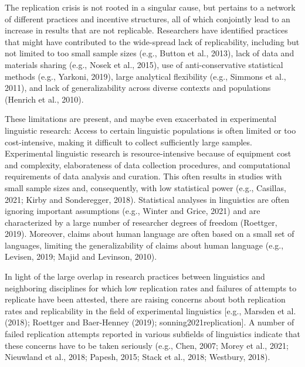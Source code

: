 \documentclass[]{elsarticle} %
\begin{document}
The replication crisis is not rooted in a singular cause, but pertains to a network of different practices and incentive structures, all of which conjointly lead to an increase in results that are not replicable. Researchers have identified practices that might have contributed to the wide-spread lack of replicability, including but not limited to too small sample sizes (e.g., Button et al., 2013), lack of data and materials sharing (e.g., Nosek et al., 2015), use of anti-conservative statistical methods (e.g., Yarkoni, 2019), large analytical flexibility (e.g., Simmons et al., 2011), and lack of generalizability across diverse contexts and populations (Henrich et al., 2010).

These limitations are present, and maybe even exacerbated in experimental linguistic research: Access to certain linguistic populations is often limited or too cost-intensive, making it difficult to collect sufficiently large samples. Experimental linguistic research is resource-intensive because of equipment cost and complexity, elaborateness of data collection procedures, and computational requirements of data analysis and curation. This often results in studies with small sample sizes and, consequently, with low statistical power (e.g., Casillas, 2021; Kirby and Sonderegger, 2018). Statistical analyses in linguistics are often ignoring important assumptions (e.g., Winter and Grice, 2021) and are characterized by a large number of researcher degrees of freedom (Roettger, 2019). Moreover, claims about human language are often based on a small set of languages, limiting the generalizability of claims about human language (e.g., Levisen, 2019; Majid and Levinson, 2010).

In light of the large overlap in research practices between linguistics and neighboring disciplines for which low replication rates and failures of attempts to replicate have been attested, there are raising concerns about both replication rates and replicability in the field of experimental linguistics {[}e.g., Marsden et al. (2018); Roettger and Baer-Henney (2019); sonning2021replication{]}. A number of failed replication attempts reported in various subfields of linguistics indicate that these concerns have to be taken seriously (e.g., Chen, 2007; Morey et al., 2021; Nieuwland et al., 2018; Papesh, 2015; Stack et al., 2018; Westbury, 2018).
\end{document}

